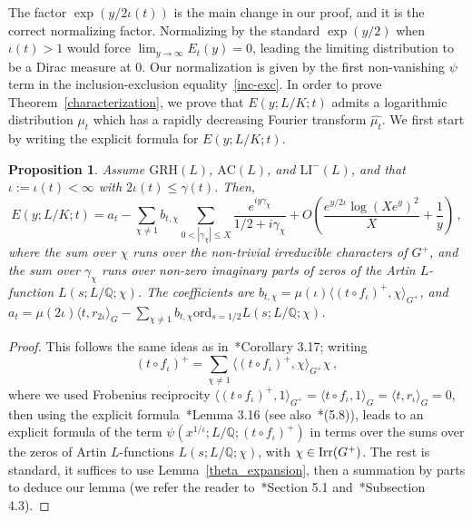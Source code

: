 \documentclass[12pt]{amsart}
\numberwithin{equation}{section}
\newcommand{\Q}{\mathbb Q}
\newcommand{\Irr}{{\rm Irr}}
\newtheorem{prop}[X]{Proposition}
\theoremstyle{definition}
\theoremstyle{remark}
\begin{document}
The factor $\exp(y / 2\iota(t))$ is the main change in our proof, and it is the correct normalizing factor. Normalizing by the standard $\exp(y/2)$ when $\iota(t) > 1$ would force $\lim_{y \to \infty} E_t(y) = 0$, leading the limiting distribution to be a Dirac measure at $0$. Our normalization is given by the first non-vanishing $\psi$ term in the inclusion-exclusion equality~\eqref{inc-exc}. In order to prove Theorem~\ref{characterization}, we prove that $E(y;L/K;t)$ admits a logarithmic distribution $\mu_t$ which has a rapidly decreasing Fourier transform $\widehat{\mu_t}$. We first start by writing the explicit formula for $E(y;L/K;t)$.
\begin{prop}\label{explicit-formula}
    Assume $\mathrm{GRH}(L)$, $\mathrm{AC}(L)$, and $\mathrm{LI}^-(L)$, and that $\iota:=\iota(t)<\infty$ with $2\iota(t)\le\gamma(t)$. Then,
    \[ E(y;L/K;t) = a_t - \sum_{\chi \ne 1} b_{t, \chi} \sum_{0 < |\gamma_\chi| \le X} \frac{e^{i y \gamma_\chi}}{1/2 + i\gamma_\chi} + O\left( \frac{e^{y/2 \iota} \log(X e^y)^2}{X} + \frac{1}{y} \right)\, , \]
    where the sum over $\chi$ runs over the non-trivial irreducible characters of $G^+$, and the sum over $\gamma_\chi$ runs over non-zero imaginary parts of zeros of the Artin $L$-function $L(s;L/\Q;\chi)$. The coefficients are $b_{t,\chi} = \mu(\iota)\langle (t \circ f_\iota)^+, \chi \rangle_{G^+}$, and $a_t = \mu(2\iota)\langle t, r_{2\iota} \rangle_G-\sum_{\chi\ne1} b_{t,\chi}\mathrm{ord}_{s=1/2}L(s;L/\Q;\chi)$.
\end{prop}
\begin{proof}
    This follows the same ideas as in~\cite{FJ}*{Corollary 3.17}; writing 
    \[ (t\circ f_\iota)^+=\sum_{\chi\ne 1} \bigl\langle (t\circ f_\iota)^+,\chi\bigr\rangle_{G^+}\chi\, ,\]
    where we used Frobenius reciprocity $ \bigl\langle (t\circ f_\iota)^+,1\bigr\rangle_{G^+}= \bigl\langle t\circ f_\iota,1\bigr\rangle_G=\langle t,r_\iota\rangle_G=0$, then using the explicit formula~\cite{FJ}*{Lemma 3.16} (see also~\cite{Ng}*{(5.8)}), leads to an explicit formula of the term $\psi\left(x^{1/\iota}; L/\Q; (t \circ f_\iota)^+\right)$ in terms over the sums over the zeros of Artin $L$-functions $L(s;L/\Q;\chi)$, with $\chi\in \Irr(G^+)$. The rest is standard, it suffices to use Lemma~\ref{theta_expansion}, then a summation by parts to deduce our lemma (we refer the reader to~\cite{Ng}*{Section 5.1} and~\cite{Dev}*{Subsection 4.3}).
\end{proof}
\end{document}

